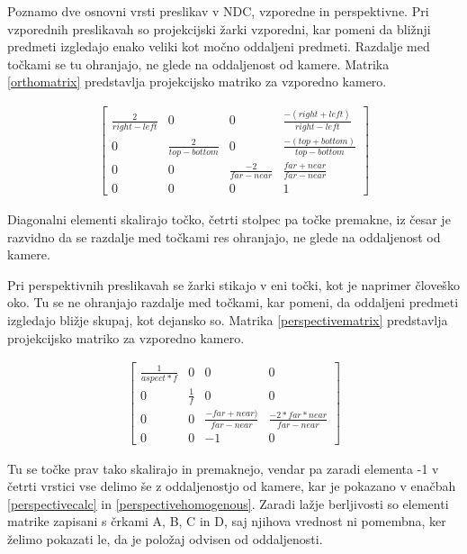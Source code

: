 \documentclass[a4paper, 12pt]{book}
\begin{document}
Poznamo dve osnovni vrsti preslikav v NDC, vzporedne in perspektivne. Pri vzporednih preslikavah so projekcijski žarki vzporedni, kar pomeni da bližnji predmeti izgledajo enako veliki kot močno oddaljeni predmeti. Razdalje med točkami se tu ohranjajo, ne glede na oddaljenost od kamere. Matrika \ref{orthomatrix} predstavlja projekcijsko matriko za vzporedno kamero.

\begin{align}
\begin{bmatrix}
\frac{2}{right-left} & 0 & 0 & \frac{-(right+left)}{right-left}\\ 
0 & \frac{2}{top-bottom} & 0 & \frac{-(top+bottom)}{top-bottom} \\ 
0 & 0 & \frac{-2}{far-near} & \frac{far+near}{far-near} \\ 
0 & 0 & 0 & 1
\end{bmatrix}
\label{orthomatrix}
\end{align}

Diagonalni elementi skalirajo točko, četrti stolpec pa točke premakne, iz česar je razvidno da se razdalje med točkami res ohranjajo, ne glede na oddaljenost od kamere.

Pri perspektivnih preslikavah se žarki stikajo v eni točki, kot je naprimer človeško oko. Tu se ne ohranjajo razdalje med točkami, kar pomeni, da oddaljeni predmeti izgledajo bližje skupaj, kot dejansko so. Matrika \ref{perspectivematrix} predstavlja projekcijsko matriko za vzporedno kamero.

\begin{align}
\begin{bmatrix}
\frac{1}{aspect*f} & 0 & 0 & 0 \\ 
0 & \frac{1}{f} & 0 & 0 \\ 
0 & 0 & \frac{-far+near)}{far-near} & \frac{-2*far*near}{far-near} \\ 
0 & 0 & -1 & 0
\end{bmatrix}
\label{perspectivematrix}
\end{align}

Tu se točke prav tako skalirajo in premaknejo, vendar pa zaradi elementa -1 v četrti vrstici vse delimo še z oddaljenostjo od kamere, kar je pokazano v enačbah \ref{perspectivecalc} in \ref{perspectivehomogenous}. Zaradi lažje berljivosti so elementi matrike zapisani s črkami A, B, C in D, saj njihova vrednost ni pomembna, ker želimo pokazati le, da je položaj odvisen od oddaljenosti.
\end{document}
